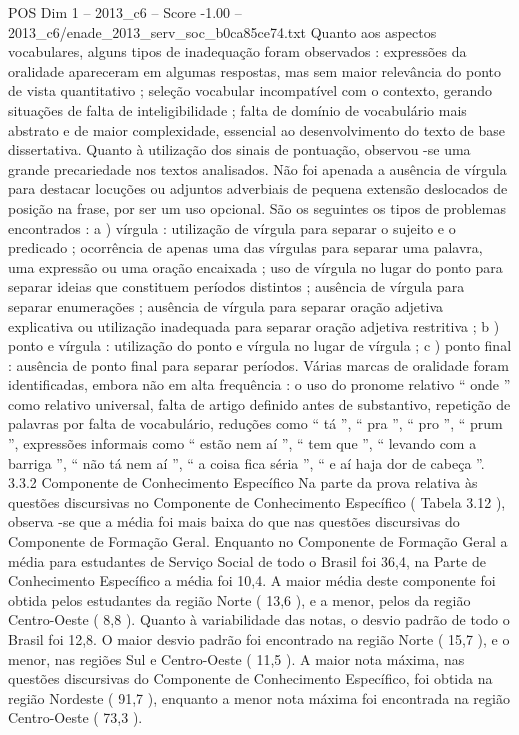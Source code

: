 \begin{textsample}{POS Dim 1 – 2013\_c6 – Score -1.00 – 2013\_c6/enade\_2013\_serv\_soc\_b0ca85ce74.txt}
Quanto aos aspectos vocabulares, alguns tipos de inadequação foram observados : expressões da oralidade apareceram em algumas respostas, mas sem maior relevância do ponto de vista quantitativo ; seleção vocabular incompatível com o contexto, gerando situações de falta de inteligibilidade ; falta de domínio de vocabulário mais abstrato e de maior complexidade, essencial ao desenvolvimento do texto de base dissertativa.
Quanto à utilização dos sinais de pontuação, observou -se uma grande precariedade nos textos analisados.
Não foi apenada a ausência de vírgula para destacar locuções ou adjuntos adverbiais de pequena extensão deslocados de posição na frase, por ser um uso opcional.
São os seguintes os tipos de problemas encontrados : a ) vírgula : utilização de vírgula para separar o sujeito e o predicado ; ocorrência de apenas uma das vírgulas para separar uma palavra, uma expressão ou uma oração encaixada ; uso de vírgula no lugar do ponto para separar ideias que constituem períodos distintos ; ausência de vírgula para separar enumerações ; ausência de vírgula para separar oração adjetiva explicativa ou utilização inadequada para separar oração adjetiva restritiva ; b ) ponto e vírgula : utilização do ponto e vírgula no lugar de vírgula ; c ) ponto final : ausência de ponto final para separar períodos.
Várias marcas de oralidade foram identificadas, embora não em alta frequência : o uso do pronome relativo “ onde ” como relativo universal, falta de artigo definido antes de substantivo, repetição de palavras por falta de vocabulário, reduções como “ tá ”, “ pra ”, “ pro ”, “ prum ”, expressões informais como “ estão nem aí ”, “ tem que ”, “ levando com a barriga ”, “ não tá nem aí ”, “ a coisa fica séria ”, “ e aí haja dor de cabeça ”. 3.3.2 Componente de Conhecimento Específico Na parte da prova relativa às questões discursivas no Componente de Conhecimento Específico ( Tabela 3.12 ), observa -se que a média foi mais baixa do que nas questões discursivas do Componente de Formação Geral.
Enquanto no Componente de Formação Geral a média para estudantes de Serviço Social de todo o Brasil foi 36,4, na Parte de Conhecimento Específico a média foi 10,4.
A maior média deste componente foi obtida pelos estudantes da região Norte ( 13,6 ), e a menor, pelos da região Centro-Oeste ( 8,8 ).
Quanto à variabilidade das notas, o desvio padrão de todo o Brasil foi 12,8.
O maior desvio padrão foi encontrado na região Norte ( 15,7 ), e o menor, nas regiões Sul e Centro-Oeste ( 11,5 ).
A maior nota máxima, nas questões discursivas do Componente de Conhecimento Específico, foi obtida na região Nordeste ( 91,7 ), enquanto a menor nota máxima foi encontrada na região Centro-Oeste ( 73,3 ).

\end{textsample}
